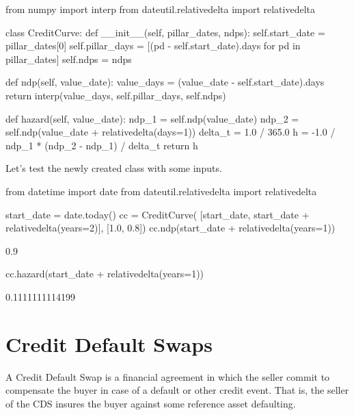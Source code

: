 \begin{ipython}
from numpy import interp
from dateutil.relativedelta import relativedelta

class CreditCurve:
    def __init__(self, pillar_dates, ndps):
        self.start_date = pillar_dates[0]
        self.pillar_days = [(pd - self.start_date).days for pd in pillar_dates]
        self.ndps = ndps
    
    def ndp(self, value_date):
        value_days = (value_date - self.start_date).days
        return interp(value_days, self.pillar_days, self.ndps)

    def hazard(self, value_date):
        ndp_1 = self.ndp(value_date)
        ndp_2 = self.ndp(value_date + relativedelta(days=1))
        delta_t = 1.0 / 365.0
        h = -1.0 / ndp_1 * (ndp_2 - ndp_1) / delta_t
        return h
\end{ipython}
\noindent
Let's test the newly created class with some inputs.
\begin{ipython}
from datetime import date
from dateutil.relativedelta import relativedelta

start_date = date.today()
cc = CreditCurve(
    [start_date, start_date + relativedelta(years=2)],
    [1.0, 0.8])
cc.ndp(start_date + relativedelta(years=1))
\end{ipython}
\begin{ioutput}
0.9
\end{ioutput}
\begin{ipython}
cc.hazard(start_date + relativedelta(years=1))
\end{ipython}
\begin{ioutput}
0.1111111114199
\end{ioutput}
            
\section{Credit Default Swaps}\label{credit-deafult-swaps}


A Credit Default Swap is a financial agreement in which the seller commit to compensate the buyer in case of a default or other credit event. That is, the seller of the CDS insures the buyer against some reference asset defaulting. 

